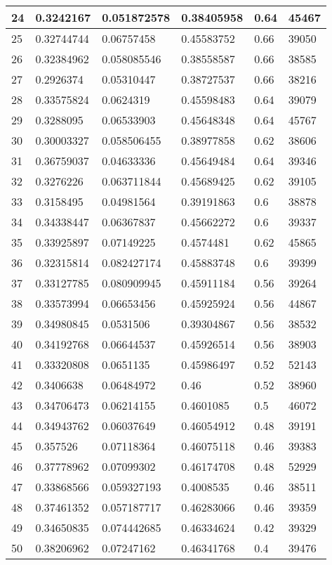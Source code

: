 \begin{longtable}{|l|l|l|l|l|l|}
24 & 0.3242167 & 0.051872578 & 0.38405958 & 0.64 & 45467 \\ \hline 
25 & 0.32744744 & 0.06757458 & 0.45583752 & 0.66 & 39050 \\ \hline 
26 & 0.32384962 & 0.058085546 & 0.38558587 & 0.66 & 38585 \\ \hline 
27 & 0.2926374 & 0.05310447 & 0.38727537 & 0.66 & 38216 \\ \hline 
28 & 0.33575824 & 0.0624319 & 0.45598483 & 0.64 & 39079 \\ \hline 
29 & 0.3288095 & 0.06533903 & 0.45648348 & 0.64 & 45767 \\ \hline 
30 & 0.30003327 & 0.058506455 & 0.38977858 & 0.62 & 38606 \\ \hline 
31 & 0.36759037 & 0.04633336 & 0.45649484 & 0.64 & 39346 \\ \hline 
32 & 0.3276226 & 0.063711844 & 0.45689425 & 0.62 & 39105 \\ \hline 
33 & 0.3158495 & 0.04981564 & 0.39191863 & 0.6 & 38878 \\ \hline 
34 & 0.34338447 & 0.06367837 & 0.45662272 & 0.6 & 39337 \\ \hline 
35 & 0.33925897 & 0.07149225 & 0.4574481 & 0.62 & 45865 \\ \hline 
36 & 0.32315814 & 0.082427174 & 0.45883748 & 0.6 & 39399 \\ \hline 
37 & 0.33127785 & 0.080909945 & 0.45911184 & 0.56 & 39264 \\ \hline 
38 & 0.33573994 & 0.06653456 & 0.45925924 & 0.56 & 44867 \\ \hline 
39 & 0.34980845 & 0.0531506 & 0.39304867 & 0.56 & 38532 \\ \hline 
40 & 0.34192768 & 0.06644537 & 0.45926514 & 0.56 & 38903 \\ \hline 
41 & 0.33320808 & 0.0651135 & 0.45986497 & 0.52 & 52143 \\ \hline 
42 & 0.3406638 & 0.06484972 & 0.46 & 0.52 & 38960 \\ \hline 
43 & 0.34706473 & 0.06214155 & 0.4601085 & 0.5 & 46072 \\ \hline 
44 & 0.34943762 & 0.06037649 & 0.46054912 & 0.48 & 39191 \\ \hline 
45 & 0.357526 & 0.07118364 & 0.46075118 & 0.46 & 39383 \\ \hline 
46 & 0.37778962 & 0.07099302 & 0.46174708 & 0.48 & 52929 \\ \hline 
47 & 0.33868566 & 0.059327193 & 0.4008535 & 0.46 & 38511 \\ \hline 
48 & 0.37461352 & 0.057187717 & 0.46283066 & 0.46 & 39359 \\ \hline 
49 & 0.34650835 & 0.074442685 & 0.46334624 & 0.42 & 39329 \\ \hline 
50 & 0.38206962 & 0.07247162 & 0.46341768 & 0.4 & 39476 \\ \hline 
\end{longtable}